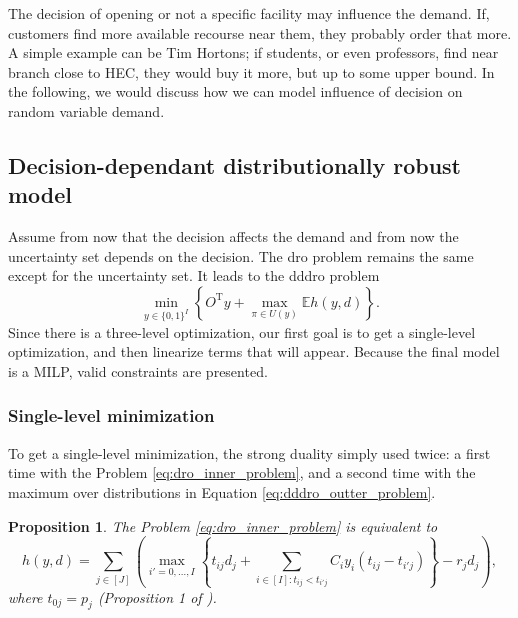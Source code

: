 \documentclass[12pt, letterpaper]{article}
\newcommand{\T}{\mathrm{T}}
\newcommand{\E}{\mathbb{E}}
\newtheorem{proposition}{Proposition}
\begin{document}
	
	The decision of opening or not a specific facility may influence the demand. If, customers find more available recourse near them, they probably order that more. A simple example can be Tim Hortons; if students, or even professors, find near branch close to HEC, they would buy it more, but up to some upper bound. In the following, we would discuss how we can model influence of decision on random variable demand.
	
	
	\subsection{Decision-dependant distributionally robust model}
	Assume from now that the decision affects the demand and from now the uncertainty set depends on the decision. The \gls{dro} problem remains the same except for the uncertainty set. It leads to the \gls{dddro} problem 
	\begin{equation}\label{eq:dddro_outter_problem}
		\min_{y \in \{0, 1\}^I} \left\{O^\T y + \max_{\pi \in U(y)} \E h(y, d)\right\}.
	\end{equation}
	Since there is a three-level optimization, our first goal is to get a single-level optimization, and then linearize terms that will appear. Because the final model is a MILP, valid constraints are presented.
	
	\subsubsection{Single-level minimization}
	To get a single-level minimization, the strong duality simply used twice: a first time with the Problem \eqref{eq:dro_inner_problem}, and a second time with the maximum over distributions in Equation \eqref{eq:dddro_outter_problem}.
	
	\begin{proposition} \label{prop:duality_inner_problem}
		The Problem \eqref{eq:dro_inner_problem} is equivalent to
		\begin{equation} \label{eq:dro_equiv_inner_problem}
			h(y, d) = \sum_{j \in [J]} \left(\max_{i' = 0, \dots, I} \left\{t_{ij} d_j + \sum_{i \in [I]: t_{ij} < t_{i'j}} C_{i}y_{i}(t_{ij} - t_{i'j})\right\} - r_j d_j\right),
		\end{equation}
		where $t_{0j} = p_j$ (Proposition 1 of \cite{basciftci_distributionally_2021}).
	\end{proposition}
	
\end{document}
